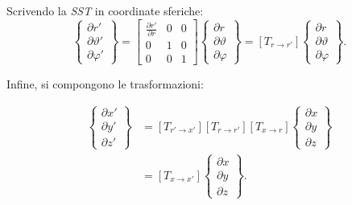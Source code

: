 Scrivendo la \textit{SST} in coordinate sferiche:
\begin{equation}
\label{eq:43dtrans}
\left\{\begin{aligned}\partial r' \\ \partial \vartheta' \\ \partial\varphi'\end{aligned}\right\}
= \left[\begin{array}{ccc}\frac{\partial r'}{\partial r} & 0 & 0\\ 0&1&0\\0&0&1\end{array}\right]
\left\{\begin{aligned}\partial r \\ \partial \vartheta\\ \partial\varphi \end{aligned}	\right\} = \left[T_{r\rightarrow r'}\right]\left\{\begin{aligned}\partial r \\ \partial \vartheta \\ \partial\varphi\end{aligned}	\right\}.
\end{equation}

Infine, si compongono le trasformazioni:

\begin{align}
\label{eq:4composizione4}
\left\{\begin{aligned}\partial x'\\ \partial y'\\ \partial z'\end{aligned}\right\} &=\left[T_{r'\rightarrow x'}\right] \left[T_{r\rightarrow r'}\right]\left[T_{x\rightarrow r}\right]\left\{\begin{aligned}\partial x\\ \partial y\\ \partial z\end{aligned}\right\}\nonumber\\
&=\left[T_{x \rightarrow x'}\right]\left\{\begin{aligned}\partial x\\ \partial y\\ \partial z\end{aligned}\right\}.
\end{align}

